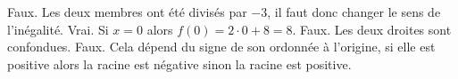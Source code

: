 %
%
    \begin{tasks}
        \task Faux. Les deux membres ont été divisés par \(-3\), il faut donc changer le sens de l'inégalité.
        \task Vrai. Si \(x=0\) alors \(f(0) = 2\cdot 0 + 8 = 8\).
        \task Faux. Les deux droites sont confondues.
        \task Faux. Cela dépend du signe de son ordonnée à l'origine, si elle est positive alors la racine est négative sinon la racine est positive.
    \end{tasks}

